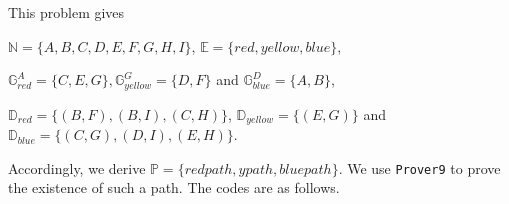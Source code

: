 \noindent This problem gives

\begin{center}
$\mathbb{N} = \{A, B, C, D, E, F, G, H, I \}$, $\mathbb{E} = \{red, yellow, blue \}$,

$\mathbb{G}_{red}^A = \{C,E, G\}, \mathbb{G}_{yellow}^G = \{D, F\}$ and $\mathbb{G}_{blue}^D = \{A, B\} $,

$\mathbb{D}_{red} = \{(B,F), (B,I), (C,H) \}$, $\mathbb{D}_{yellow} = \{(E,G) \}$ and $\mathbb{D}_{blue} = \{(C,G), (D,I), (E,H) \}$.

\end{center}
Accordingly, we derive $\mathbb{P} = \{redpath, ypath, bluepath\}$. We use {\tt Prover9} to prove the existence of such a path. The codes are as follows.

\vspace{3mm}

